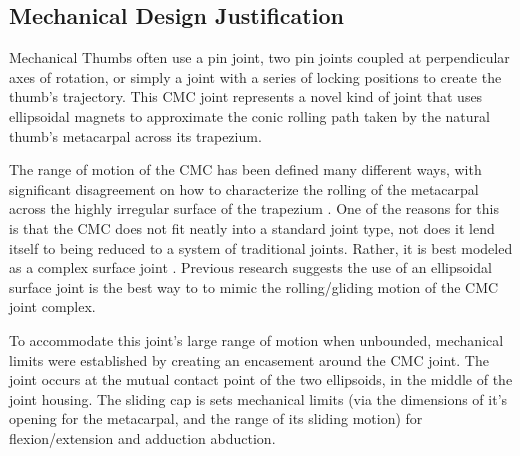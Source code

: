 \documentclass[letterpaper, 10 pt, conference]{ieeeconf}  %
\begin{document}
\subsection{Mechanical Design Justification}

Mechanical Thumbs often use a pin joint, two pin joints coupled at perpendicular axes of rotation, or simply a joint with a series of locking positions to create the thumb's trajectory. This CMC joint represents a novel kind of joint that uses ellipsoidal magnets to approximate the conic rolling path taken by the natural thumb's metacarpal across its trapezium. 

The range of motion of the CMC has been defined many different ways, with significant disagreement on how to characterize the rolling of the metacarpal across the highly irregular surface of the trapezium \cite{Hollister}. One of the reasons for this is that the CMC does not fit neatly into a  standard joint type, not does it lend itself to being reduced to a system of traditional joints. Rather, it is best modeled as a complex surface joint \cite{Synek}. Previous research \cite{Chalon} suggests the use of an ellipsoidal surface joint is the best way to to mimic the rolling/gliding motion of the CMC joint complex. 

To accommodate this joint's large range of motion when unbounded, mechanical limits were established by creating an encasement around the CMC joint. The joint occurs at the mutual contact point of the two ellipsoids, in the middle of the joint housing. The sliding cap is sets mechanical limits (via the dimensions of it's opening for the metacarpal, and the range of its sliding motion) for flexion/extension and adduction abduction. 
\end{document}
